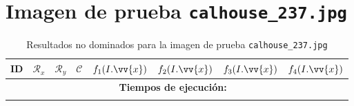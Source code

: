 \section{Imagen de prueba \texttt{calhouse\_237.jpg}}

\scriptsize
\begin{longtable}{|c|c|c|c|c|c|c|c|}
\hline
ID & $\mathscr{R}_x$ & $\mathscr{R}_y$ & $\mathscr{C}$ & $f_1(I.\vv{x})$ & $f_2(I.\vv{x})$ & $f_3(I.\vv{x})$ & $f_4(I.\vv{x})$ \\
\hline

\multicolumn{8}{|c|}{\textbf{Tiempos de ejecución:} \texttt{
}}\\ \hline
\caption{Resultados no dominados para la imagen de prueba \texttt{calhouse\_237.jpg}}
\label{tab:calhouse_237}
\end{longtable}
\normalsize


